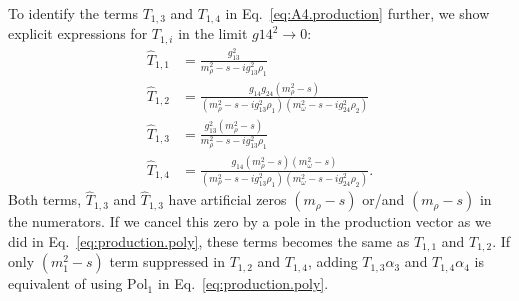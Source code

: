 \documentclass[aps,prd,superscriptaddress,onecolumn,nofootinbib,preprintnumbers,notitlepage]{revtex4-1}
\begin{document}
To identify the terms $T_{1,3}$ and $T_{1,4}$ in Eq.~\eqref{eq:A4.production} further,
we show explicit expressions for $T_{1,i}$ in the limit $g{14}^2 \to 0$:
\begin{align}
  \hat{T}_{1,1} &= \frac{g_{13}^2}{m_\rho^2-s-ig_{13}^2 \rho_1}\\
  \hat{T}_{1,2} &= \frac{g_{14} g_{24} (m_\rho^2-s)}{(m_\rho^2-s-ig_{13}^2 \rho_1)(m_\omega^2-s-ig_{24}^2 \rho_2)}\\
  \hat{T}_{1,3} &= \frac{g_{13}^2 (m_\rho^2-s)}{m_\rho^2-s-ig_{13}^2 \rho_1}\\
  \hat{T}_{1,4} &= \frac{g_{14} (m_\rho^2-s)(m_\omega^2-s)}{(m_\rho^2-s-ig_{13}^2 \rho_1)(m_\omega^2-s-ig_{24}^2 \rho_2)}.
\end{align}
Both terms, $\hat{T}_{1,3}$ and $\hat{T}_{1,3}$ have artificial zeros $(m_\rho-s)$ or/and $(m_\rho-s)$ in the numerators.
If we cancel this zero by a pole in the production vector as we did in Eq.~\ref{eq:production.poly},
these terms becomes the same as $T_{1,1}$ and $T_{1,2}$.
If only $(m_1^2-s)$ term suppressed in $T_{1,2}$ and $T_{1,4}$,
adding $T_{1,3}\alpha_3$ and $T_{1,4}\alpha_4$ is equivalent of using $\text{Pol}_1$ in Eq.~\ref{eq:production.poly}.

\end{document}
